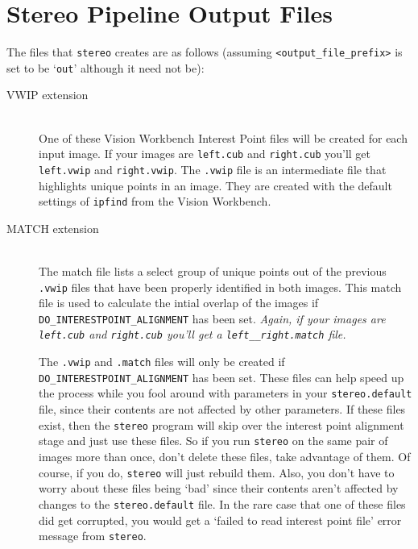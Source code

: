\chapter{Stereo Pipeline Output Files}

The files that \verb=stereo= creates are as follows (assuming
\verb=<output_file_prefix>= is set to be `\verb=out=' although it need
not be):

\begin{description}

\item[VWIP extension] \hfill \\ 
  One of these Vision Workbench Interest
  Point files will be created for each input image. If your images are
  \texttt{left.cub} and \texttt{right.cub} you'll get
  \texttt{left.vwip} and \texttt{right.vwip}. The \texttt{.vwip} file
  is an intermediate file that highlights unique points in an
  image. They are created with the default settings of \texttt{ipfind}
  from the Vision Workbench.

\item[MATCH extension] \hfill \\ 
  The match file lists a select group
  of unique points out of the previous \texttt{.vwip} files that have
  been properly identified in both images. This match file is used to
  calculate the intial overlap of the images if
  \texttt{DO\_INTERESTPOINT\_ALIGNMENT} has been set.  \emph{Again, if
    your images are \texttt{left.cub} and \texttt{right.cub} you'll
    get a \texttt{left\_\_right.match} file.}

  The \texttt{.vwip} and \texttt{.match} files will only be created if
  \texttt{DO\_INTERESTPOINT\_ALIGNMENT} has been set.  These files can
  help speed up the process while you fool around with parameters in
  your \texttt{stereo.default} file, since their contents are not
  affected by other parameters.  If these files exist, then the
  \texttt{stereo} program will skip over the interest point alignment
  stage and just use these files.  So if you run \texttt{stereo} on
  the same pair of images more than once, don't delete these files,
  take advantage of them.  Of course, if you do, \texttt{stereo} will
  just rebuild them.  Also, you don't have to worry about these files
  being `bad' since their contents aren't affected by changes to the
  \texttt{stereo.default} file.  In the rare case that one of these
  files did get corrupted, you would get a `failed to read interest
  point file' error message from \texttt{stereo}.


\end{description}
